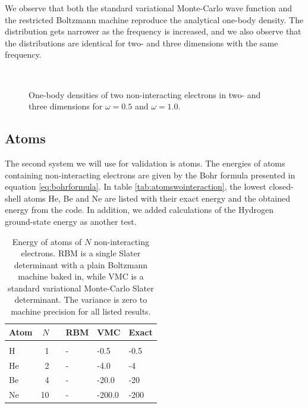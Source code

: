 We observe that both the standard variational Monte-Carlo wave function and the restricted Boltzmann machine reproduce the analytical one-body density. The distribution gets narrower as the frequency is increased, and we also observe that the distributions are identical for two- and three dimensions with the same frequency.

\begin{figure}[h]
	\centering
	\\
	
	\caption{One-body densities of two non-interacting electrons in two- and three dimensions for $\omega=0.5$ and $\omega=1.0$.}%
	\label{fig:OB_nointeraction}
\end{figure}

\newpage
\subsection{Atoms}
The second system we will use for validation is atoms. The energies of atoms containing non-interacting electrons are given by the Bohr formula presented in equation \eqref{eq:bohrformula}. In table \eqref{tab:atomswointeraction}, the lowest closed-shell atoms He, Be and Ne are listed with their exact energy and the obtained energy from the code. In addition, we added calculations of the Hydrogen ground-state energy as another test.

\begin{table} [H]
	\caption{Energy of atoms of $N$ non-interacting electrons. RBM is a single Slater determinant with a plain Boltzmann machine baked in, while VMC is a standard variational Monte-Carlo Slater determinant. The variance is zero to machine precision for all listed results. }
	\label{tab:atomswointeraction}
	\begin{tabularx}{\textwidth}{lrrR{3.5cm}R{3.5cm}R{3.5cm}} \hline\hline
		Atom & $N$ & \makecell{\\ \phantom{=}} & RBM & VMC & Exact \\ \hline \\
		
		H & 1 && - & -0.5 & -0.5 \\
		He & 2 && - & -4.0 & -4 \\
		Be & 4 && - & -20.0 & -20 \\
		Ne & 10 && - & -200.0 & -200 \\ \hline\hline
	\end{tabularx}
\end{table}

